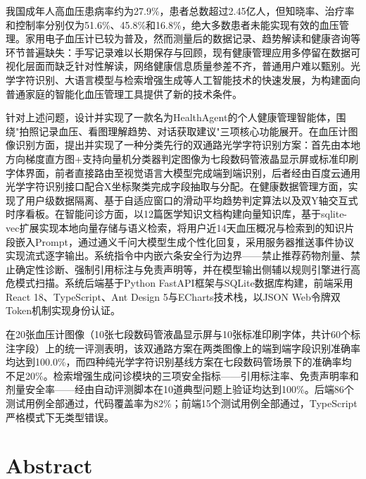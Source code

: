 \documentclass[zihao=-4,a4paper]{ctexart}
\begin{document}
{\songti
我国成年人高血压患病率约为27.9\%，患者总数超过2.45亿人，但知晓率、治疗率和控制率分别仅为51.6\%、45.8\%和16.8\%，绝大多数患者未能实现有效的血压管理。家用电子血压计已较为普及，然而测量后的数据记录、趋势解读和健康咨询等环节普遍缺失：手写记录难以长期保存与回顾，现有健康管理应用多停留在数据可视化层面而缺乏针对性解读，网络健康信息质量参差不齐，普通用户难以甄别。光学字符识别、大语言模型与检索增强生成等人工智能技术的快速发展，为构建面向普通家庭的智能化血压管理工具提供了新的技术条件。

针对上述问题，设计并实现了一款名为HealthAgent的个人健康管理智能体，围绕"拍照记录血压、看图理解趋势、对话获取建议"三项核心功能展开。在血压计图像识别方面，提出并实现了一种分类先行的双通路光学字符识别方案：首先由本地方向梯度直方图+支持向量机分类器判定图像为七段数码管液晶显示屏或标准印刷字体界面，前者直接路由至视觉语言大模型完成端到端识别，后者经由百度云通用光学字符识别接口配合X坐标聚类完成字段抽取与分配。在健康数据管理方面，实现了用户级数据隔离、基于自适应窗口的滑动平均趋势判定算法以及双Y轴交互式时序看板。在智能问诊方面，以12篇医学知识文档构建向量知识库，基于sqlite-vec扩展实现本地向量存储与语义检索，将用户近14天血压概况与检索到的知识片段嵌入Prompt，通过通义千问大模型生成个性化回复，采用服务器推送事件协议实现流式逐字输出。系统指令中内嵌六条安全行为边界——禁止推荐药物剂量、禁止确定性诊断、强制引用标注与免责声明等，并在模型输出侧辅以规则引擎进行高危模式扫描。系统后端基于Python FastAPI框架与SQLite数据库构建，前端采用React 18、TypeScript、Ant Design 5与ECharts技术栈，以JSON Web令牌双Token机制实现身份认证。

在20张血压计图像（10张七段数码管液晶显示屏与10张标准印刷字体，共计60个标注字段）上的统一评测表明，该双通路方案在两类图像上的端到端字段识别准确率均达到100.0\%，而四种纯光学字符识别基线方案在七段数码管场景下的准确率均不足20\%。检索增强生成问诊模块的三项安全指标——引用标注率、免责声明率和剂量安全率——经由自动评测脚本在10道典型问题上验证均达到100\%。后端86个测试用例全部通过，代码覆盖率为82\%；前端15个测试用例全部通过，TypeScript严格模式下无类型错误。
}

\vspace{1cm}

\newpage
\section*{Abstract}
\end{document}
